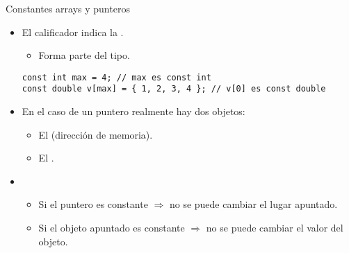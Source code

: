 \begin{frame}[t,fragile]{Constantes arrays y punteros}
\begin{itemize}
  \item El calificador  indica la .
    \begin{itemize}
      \item Forma parte del tipo.
    \end{itemize}
\begin{lstlisting}
const int max = 4; // max es const int
const double v[max] = { 1, 2, 3, 4 }; // v[0] es const double
\end{lstlisting}

  \item En el caso de un puntero realmente hay dos objetos:
    \begin{itemize}
      \item El  (dirección de memoria).
      \item El .
    \end{itemize}

  \item {}
    \begin{itemize}
      \item Si el puntero es constante $\Rightarrow$ 
            no se puede cambiar el lugar apuntado.
      \item Si el objeto apuntado es constante $\Rightarrow$
            no se puede cambiar el valor del objeto.
    \end{itemize}
\end{itemize}
\end{frame}

